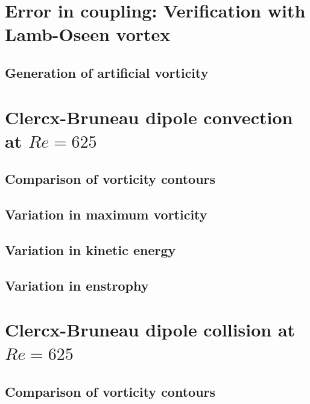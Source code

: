 	




\section{Error in coupling: Verification with Lamb-Oseen vortex}

	\subsection{Generation of artificial vorticity}


\section{Clercx-Bruneau dipole convection at $Re=625$}

	\subsection{Comparison of vorticity contours}
	
	\subsection{Variation in maximum vorticity}
	
	\subsection{Variation in kinetic energy}
	
	\subsection{Variation in enstrophy}

\section{Clercx-Bruneau dipole collision at $Re=625$}

	\subsection{Comparison of vorticity contours}
	
